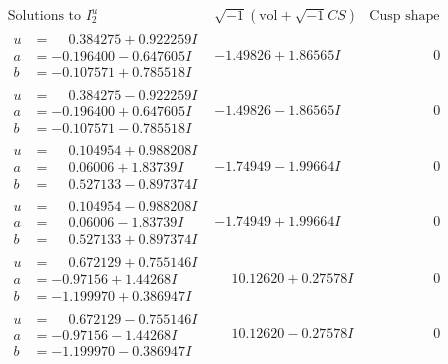 \documentclass[1p]{elsarticle_modified}
\theoremstyle{definition}
\newcommand{\I}{\sqrt{-1}}
\begin{document}
$$\begin{array}{c|c|c}  
\text{Solutions to }I^u_{2}& \I (\text{vol} + \sqrt{-1}CS) & \text{Cusp shape}\\
 \hline 
\begin{aligned}
u &= \phantom{-}0.384275 + 0.922259 I \\
a &= -0.196400 - 0.647605 I \\
b &= -0.107571 + 0.785518 I\end{aligned}
 & -1.49826 + 1.86565 I & \phantom{-0.000000 } 0 \\ \hline\begin{aligned}
u &= \phantom{-}0.384275 - 0.922259 I \\
a &= -0.196400 + 0.647605 I \\
b &= -0.107571 - 0.785518 I\end{aligned}
 & -1.49826 - 1.86565 I & \phantom{-0.000000 } 0 \\ \hline\begin{aligned}
u &= \phantom{-}0.104954 + 0.988208 I \\
a &= \phantom{-}0.06006 + 1.83739 I \\
b &= \phantom{-}0.527133 - 0.897374 I\end{aligned}
 & -1.74949 - 1.99664 I & \phantom{-0.000000 } 0 \\ \hline\begin{aligned}
u &= \phantom{-}0.104954 - 0.988208 I \\
a &= \phantom{-}0.06006 - 1.83739 I \\
b &= \phantom{-}0.527133 + 0.897374 I\end{aligned}
 & -1.74949 + 1.99664 I & \phantom{-0.000000 } 0 \\ \hline\begin{aligned}
u &= \phantom{-}0.672129 + 0.755146 I \\
a &= -0.97156 + 1.44268 I \\
b &= -1.199970 + 0.386947 I\end{aligned}
 & \phantom{-}10.12620 + 0.27578 I & \phantom{-0.000000 } 0 \\ \hline\begin{aligned}
u &= \phantom{-}0.672129 - 0.755146 I \\
a &= -0.97156 - 1.44268 I \\
b &= -1.199970 - 0.386947 I\end{aligned}
 & \phantom{-}10.12620 - 0.27578 I & \phantom{-0.000000 } 0 \\ \hline\begin{aligned}

\end{aligned}
\end{array}$$
\end{document}
